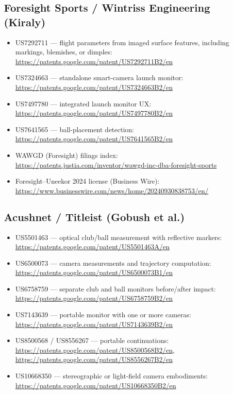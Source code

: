 \subsection*{Foresight Sports / Wintriss Engineering (Kiraly)}
\begin{itemize}\small
\item US7292711 --- flight parameters from imaged surface features,
  including markings, blemishes, or dimples:
  \url{https://patents.google.com/patent/US7292711B2/en}
\item US7324663 --- standalone smart-camera launch monitor:
  \url{https://patents.google.com/patent/US7324663B2/en}
\item US7497780 --- integrated launch monitor UX:
  \url{https://patents.google.com/patent/US7497780B2/en}
\item US7641565 --- ball-placement detection:
  \url{https://patents.google.com/patent/US7641565B2/en}
\item WAWGD (Foresight) filings index:
  \url{https://patents.justia.com/inventor/wawgd-inc-dba-foresight-sports}
\item Foresight--Uneekor 2024 license (Business Wire):
  \url{https://www.businesswire.com/news/home/20240930838753/en/}
\end{itemize}

\subsection*{Acushnet / Titleist (Gobush et al.)}
\begin{itemize}\small
\item US5501463 --- optical club/ball measurement with reflective markers:
  \url{https://patents.google.com/patent/US5501463A/en}
\item US6500073 --- camera measurements and trajectory computation:
  \url{https://patents.google.com/patent/US6500073B1/en}
\item US6758759 --- separate club and ball monitors before/after impact:
  \url{https://patents.google.com/patent/US6758759B2/en}
\item US7143639 --- portable monitor with one or more cameras:
  \url{https://patents.google.com/patent/US7143639B2/en}
\item US8500568 / US8556267 --- portable continuations:
  \url{https://patents.google.com/patent/US8500568B2/en},
  \url{https://patents.google.com/patent/US8556267B2/en}
\item US10668350 --- stereographic or light-field camera embodiments:
  \url{https://patents.google.com/patent/US10668350B2/en}
\end{itemize}

